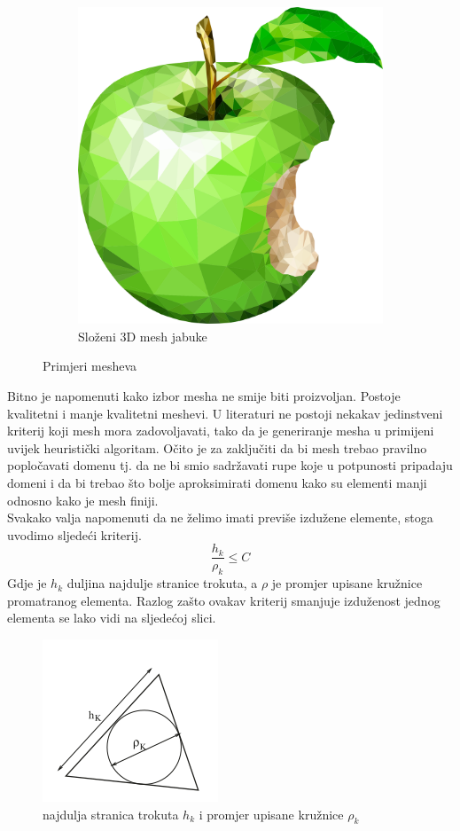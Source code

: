 \documentclass[zavrsnirad]{../fer}
\begin{document}
\begin{figure}[htbp]
\begin{subfigure}[b]{0.45\linewidth}
    \includegraphics[width=\linewidth]{Figures/apple.png}
    \caption{Složeni 3D mesh jabuke}
    \label{jabuka}
  \end{subfigure}
  \caption{Primjeri mesheva}
  \label{meshevi}
\end{figure}

Bitno je napomenuti kako izbor mesha ne smije biti 
proizvoljan. Postoje kvalitetni i manje kvalitetni 
meshevi. U literaturi ne postoji nekakav jedinstveni 
kriterij koji mesh mora zadovoljavati, tako da 
je generiranje mesha u primijeni uvijek heuristički 
algoritam.
Očito je za zaključiti da bi mesh trebao pravilno popločavati
domenu tj. da ne bi smio sadržavati rupe koje u potpunosti
pripadaju domeni i da bi trebao što bolje aproksimirati domenu
kako su elementi manji odnosno kako je mesh finiji.
\bigskip
\\ 
Svakako valja napomenuti da ne želimo imati previše izdužene
elemente, stoga uvodimo sljedeći kriterij.
$$\frac{h_k}{\rho_k} \leq C$$
Gdje je $h_k$ duljina najdulje stranice trokuta, a 
$\rho$ je promjer upisane kružnice promatranog 
elementa. Razlog zašto ovakav kriterij smanjuje 
izduženost jednog elementa se lako vidi na sljedećoj
slici.
\begin{figure}[htb]
	\centering
	\includegraphics[width=0.38\linewidth]{Figures/element.png}
	\caption{najdulja stranica trokuta $h_k$ i promjer
  upisane kružnice $\rho_k$}
\end{figure}
\end{document}
